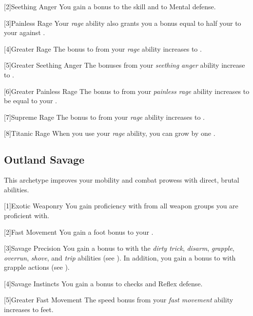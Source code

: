         [2]{Seething Anger}
        You gain a  bonus to the  skill and to Mental defense.

        [3]{Painless Rage} Your \textit{rage} ability also grants you a bonus equal to half your  to your  against .

        [4]{Greater Rage} The bonus to  from your \textit{rage} ability increases to .

        [5]{Greater Seething Anger}
        The bonuses from your \textit{seething anger} ability increase to .

        [6]{Greater Painless Rage} The bonus to  from your \textit{painless rage} ability increases to be equal to your .

        [7]{Supreme Rage} The bonus to  from your \textit{rage} ability increases to .

        [8]{Titanic Rage}
        When you use your \textit{rage} ability, you can grow by one .

    \subsection{Outland Savage}
        This archetype improves your mobility and combat prowess with direct, brutal abilities.

        [1]{Exotic Weaponry} You gain proficiency with  from all weapon groups you are proficient with.

        [2]{Fast Movement} You gain a  foot bonus to your .

        [3]{Savage Precision} You gain a  bonus to  with the \textit{dirty trick}, \textit{disarm}, \textit{grapple}, \textit{overrun}, \textit{shove}, and \textit{trip} abilities (see ).
        In addition, you gain a  bonus to  with grapple actions (see ).

        [4]{Savage Instincts} You gain a  bonus to  checks and Reflex defense.

        [5]{Greater Fast Movement} The speed bonus from your \textit{fast movement} ability increases to  feet.

